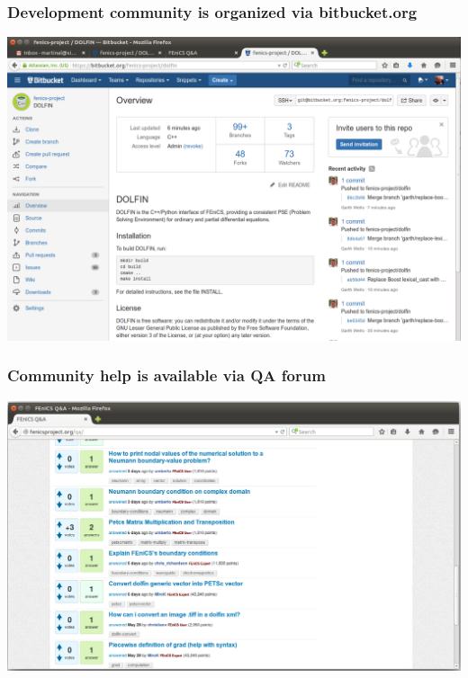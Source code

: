 \begin{frame}
    \frametitle{Development community is organized via bitbucket.org}
    \begin{center}
        \includegraphics[height=0.75\textheight]{png/fenics-bitbucket-webpage.png}
        \vspace{1em}
        \small
    \end{center}
\end{frame}
\begin{frame}
    \frametitle{Community help is available via QA forum}
    \begin{center}
        \includegraphics[width=1.0\textwidth,height=0.7\textheight]{png/fenics-qa-website.png}
        \vspace{1em}
        \small
    \end{center}
\end{frame}
